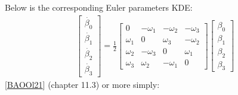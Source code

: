 \documentclass[letterpaper,10pt,english]{jupyterBook}
\begin{document}
\sphinxAtStartPar
Below is the corresponding Euler parameters KDE:
\begin{equation}\label{equation:5IMU:EP-KDE}
\begin{split}\begin{bmatrix} \dot{\beta_0} \\ \dot{\beta_1} \\ \dot{\beta_2} \\ \dot{\beta_3} \end{bmatrix} = \frac{1}{2} \begin{bmatrix} 0 & -\omega_1 & -\omega_2 & -\omega_3 \\ \omega_1 & 0 & \omega_3 & -\omega_2 \\ \omega_2 & -\omega_3 & 0 & \omega_1 \\ \omega_3 & \omega_2 & -\omega_1 & 0\end{bmatrix} \begin{bmatrix} \beta_0 \\ \beta_1 \\ \beta_2 \\ \beta_3 \end{bmatrix}\end{split}
\end{equation}
\sphinxAtStartPar
{[}\hyperlink{cite.99Bibliography:id3}{BAOOl21}{]} (chapter 11.3) or more simply:
\end{document}
